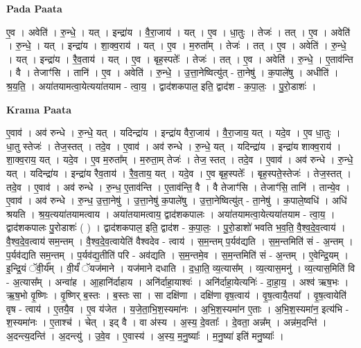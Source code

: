 \documentclass[17pt]{extarticle}
\begin{document}
\textbf{Pada Paata} \newline

ए॒व । अवेति॑ । रु॒न्धे॒ । यत् । इन्द्रा॑य । वै॒रा॒जाय॑ । यत् । ए॒व । धा॒तुः । तेजः॑ । तत् । ए॒व । अवेति॑ । रु॒न्धे॒ । यत् । इन्द्रा॑य । शा॒क्व॒राय॑ । यत् । ए॒व । म॒रुता᳚म् । तेजः॑ । तत् । ए॒व । अवेति॑ । रु॒न्धे॒ । यत् । इन्द्रा॑य । रै॒व॒ताय॑ । यत् । ए॒व । बृह॒स्पतेः᳚ । तेजः॑ । तत् । ए॒व । अवेति॑ । रु॒न्धे॒ । ए॒ताव॑न्ति । वै । तेजाꣳ॑सि । तानि॑ । ए॒व । अवेति॑ । रु॒न्धे॒ । उ॒त्ता॒नेष्वित्यु॑त् - ता॒नेषु॑ । क॒पाले॑षु । अधीति॑ । श्र॒य॒ति॒ । अया॑तयामत्वा॒येत्यया॑तयाम - त्वा॒य॒ । द्वाद॑शकपाल॒ इति॒ द्वाद॑श - क॒पा॒लः॒ । पु॒रो॒डाशः॑ ।  \newline


\textbf{Krama Paata} \newline

ए॒वाव॑ । अव॑ रुन्धे । रु॒न्धे॒ यत् । यदिन्द्रा॑य । इन्द्रा॑य वैरा॒जाय॑ । वै॒रा॒जाय॒ यत् । यदे॒व । ए॒व धा॒तुः । धा॒तु स्तेजः॑ । तेज॒स्तत् । तदे॒व । ए॒वाव॑ । अव॑ रुन्धे । रु॒न्धे॒ यत् । यदिन्द्रा॑य । इन्द्रा॑य शाक्व॒राय॑ । शा॒क्व॒राय॒ यत् । यदे॒व । ए॒व म॒रुता᳚म् । म॒रुता॒म् तेजः॑ । तेज॒ स्तत् । तदे॒व । ए॒वाव॑ । अव॑ रुन्धे । रु॒न्धे॒ यत् । यदिन्द्रा॑य । इन्द्रा॑य रैव॒ताय॑ । रै॒व॒ताय॒ यत् । यदे॒व । ए॒व बृह॒स्पतेः᳚ । बृह॒स्पते॒स्तेजः॑ । तेज॒स्तत् । तदे॒व । ए॒वाव॑ । अव॑ रुन्धे । रु॒न्ध॒ ए॒ताव॑न्ति । ए॒ताव॑न्ति॒ वै । वै तेजाꣳ॑सि । तेजाꣳ॑सि॒ तानि॑ । तान्ये॒व । ए॒वाव॑ । अव॑ रुन्धे । रु॒न्ध॒ उ॒त्ता॒नेषु॑ । उ॒त्ता॒नेषु॑ क॒पाले॑षु । उ॒त्ता॒नेष्वित्यु॑त् - ता॒नेषु॑ । क॒पाले॒ष्वधि॑ । अधि॑ श्रयति । श्र॒य॒त्यया॑तयामत्वाय । अया॑तयामत्वाय॒ द्वाद॑शकपालः । अया॑तयामत्वा॒येत्यया॑तयाम - त्वा॒य॒ । द्वाद॑शकपालः पु॒रोडाशः॑ ( ) । द्वाद॑शकपाल॒ इति॒ द्वाद॑श - क॒पा॒लः॒ । पु॒रो॒डाशो॑ भवति \newline
भ॒व॒ति॒ वै॒श्व॒दे॒व॒त्वाय॑ । वै॒श्व॒दे॒व॒त्वाय॑ सम॒न्तम् । वै॒श्व॒दे॒व॒त्वायेति॑ वैश्वदेव - त्वाय॑ । स॒म॒न्तम् प॒र्यव॑द्यति । स॒म॒न्तमिति॑ सं - अ॒न्तम् । प॒र्यव॑द्यति सम॒न्तम् । प॒र्यव॑द्य॒तीति॑ परि - अव॑द्यति । स॒म॒न्तमे॒व । स॒म॒न्तमिति॑ सं - अ॒न्तम् । ए॒वेन्द्रि॒यम् । इ॒न्द्रि॒यं ॅवी॒र्य᳚म् । वी॒र्यं॑ ॅयज॑माने । यज॑माने दधाति । द॒धा॒ति॒ व्य॒त्यास᳚म् । व्य॒त्यास॒मनु॑ । व्य॒त्यास॒मिति॑ वि - अ॒त्यास᳚म् । अन्वा॑ह । आ॒हानि॑र्दाहाय । अनि॑र्दाहा॒याश्वः॑ । अनि॑र्दाहा॒येत्यनिः॑ - दा॒हा॒य॒ । अश्व॑ ऋष॒भः । ऋ॒ष॒भो वृ॒ष्णिः । वृ॒ष्णिर् ब॒स्तः । ब॒स्तः सा । सा दक्षि॑णा । दक्षि॑णा वृष॒त्वाय॑ । वृ॒ष॒त्वायै॒तया᳚ । वृ॒ष॒त्वायेति॑ वृष - त्वाय॑ । ए॒तयै॒व । ए॒व य॑जेत । य॒जे॒ता॒भि॒श॒स्यमा॑नः । अ॒भि॒श॒स्यमा॑न ए॒ताः । अ॒भि॒श॒स्यमा॑न॒ इत्य॑भि - श॒स्यमा॑नः । ए॒ताश्च॑ । चेत् । इद् वै । वा अ॑स्य । अ॒स्य॒ दे॒वताः᳚ । दे॒वता॒ अन्न᳚म् । अन्न॑म॒दन्ति॑ । अ॒दन्त्य॒दन्ति॑ । अ॒दन्त्यु॑ । उ॒वे॒व । ए॒वास्य॑ । अ॒स्य॒ म॒नु॒ष्याः᳚ । म॒नु॒ष्या॑ इति॑ मनु॒ष्याः᳚ । \newline
\end{document}
